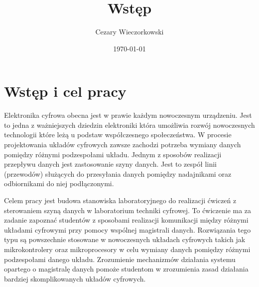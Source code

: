 \documentclass[../main.tex]{subfiles}
\author{Cezary Wieczorkowski}
\date{\today}
\title{Wstęp}
\begin{document}
\section{Wstęp i cel pracy}

Elektronika cyfrowa obecna jest w prawie każdym nowoczesnym urządzeniu. Jest to jedna z ważniejszych dziedzin elektroniki 
która umożliwia rozwój nowoczesnych technologii które leżą u podstaw współczesnego społeczeństwa. W procesie projektowania układów cyfrowych
zawsze zachodzi potrzeba wymiany danych pomiędzy różnymi podzespołami układu. Jednym z sposobów realizacji przepływu danych jest zastosowanie
szyny danych. Jest to zespół linii (przewodów) służących do przesyłania danych pomiędzy nadajnikami oraz odbiornikami do niej podłączonymi. 
\par
Celem pracy jest budowa stanowiska laboratoryjnego do realizacji ćwiczeń z sterowaniem szyną danych w laboratorium techniki cyfrowej.
To ćwiczenie ma za zadanie zapoznać studentów z sposobami realizacji komunikacji między różnymi układami cyfrowymi przy pomocy
wspólnej magistrali danych. Rozwiązania tego typu są powszechnie stosowane w nowoczesnych układach cyfrowych takich jak mikrokontrolery oraz
mikroprocesory w celu wymiany danych pomiędzy różnymi podzespołami danego układu. Zrozumienie mechanizmów działania systemu opartego o 
magistralę danych pomoże studentom w zrozumienia zasad działania bardziej skomplikowanych układów cyfrowych.
\end{document}
